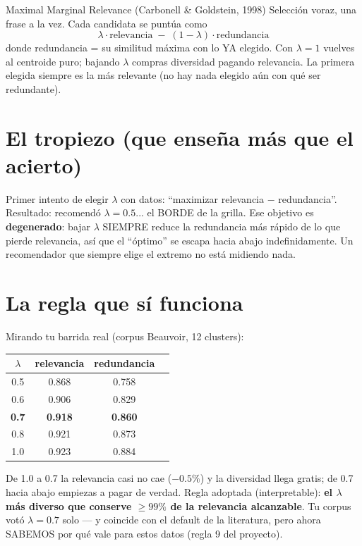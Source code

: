 \documentclass[11pt,a4paper]{article}
\begin{document}
\begin{concepto}{Maximal Marginal Relevance (Carbonell \& Goldstein, 1998)}
Selección voraz, una frase a la vez. Cada candidata se puntúa como
\[
\lambda \cdot \mathrm{relevancia} \;-\; (1-\lambda) \cdot \mathrm{redundancia}
\]
donde redundancia = su similitud máxima con lo YA elegido. Con $\lambda = 1$ vuelves al
centroide puro; bajando $\lambda$ compras diversidad pagando relevancia. La primera
elegida siempre es la más relevante (no hay nada elegido aún con qué ser redundante).
\end{concepto}

\section{El tropiezo (que enseña más que el acierto)}

Primer intento de elegir $\lambda$ con datos: ``maximizar relevancia $-$ redundancia''.
Resultado: recomendó $\lambda = 0.5$... el BORDE de la grilla. Ese objetivo es
\textbf{degenerado}: bajar $\lambda$ SIEMPRE reduce la redundancia más rápido de lo que
pierde relevancia, así que el ``óptimo'' se escapa hacia abajo indefinidamente. Un
recomendador que siempre elige el extremo no está midiendo nada.

\section{La regla que sí funciona}

Mirando tu barrida real (corpus Beauvoir, 12 clusters):

\begin{center}
\begin{tabular}{cccc}
$\lambda$ & relevancia & redundancia \\
\hline
0.5 & 0.868 & 0.758 \\
0.6 & 0.906 & 0.829 \\
\textbf{0.7} & \textbf{0.918} & \textbf{0.860} \\
0.8 & 0.921 & 0.873 \\
1.0 & 0.923 & 0.884 \\
\end{tabular}
\end{center}

De 1.0 a 0.7 la relevancia casi no cae ($-0.5\%$) y la diversidad llega gratis; de 0.7
hacia abajo empiezas a pagar de verdad. Regla adoptada (interpretable): \textbf{el
$\lambda$ más diverso que conserve $\geq 99\%$ de la relevancia alcanzable}. Tu corpus
votó $\lambda = 0.7$ solo --- y coincide con el default de la literatura, pero ahora
SABEMOS por qué vale para estos datos (regla 9 del proyecto).
\end{document}
